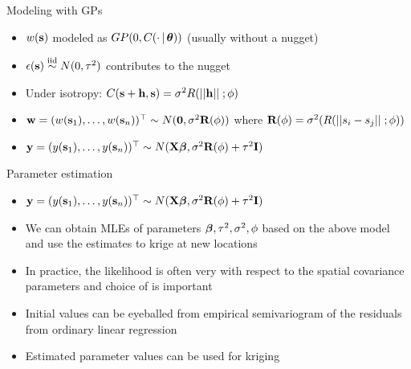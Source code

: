 \begin{frame}{Modeling with GPs}
	\begin{itemize}\setlength{\itemsep}{0.25cm}
		\item $w(\textbf{s})$ modeled as $GP(0,C(\cdot\,|\, \mbox{\boldmath $ \theta $}))$ (usually without a nugget)
		\item $\epsilon(\textbf{s}) \stackrel{\mathrm{iid}}{\sim} N(0,\tau^2)$ contributes to the nugget
		\item Under isotropy: $C(\textbf{s}+\textbf{h},\textbf{s}) = \sigma^2 R(||\textbf{h}|| \; ; \phi )$
		\item $\textbf{w} = (w(\textbf{s}_1),\ldots,w(\textbf{s}_n))^\top \sim N(\textbf{0}, \sigma^2 \textbf{R}(\phi))$ where $\textbf{R}(\phi) = \sigma^2 (R(||s_i-s_j|| \; ; \phi))$
		\item $\textbf{y}=(y(\textbf{s}_1),\ldots,y(\textbf{s}_n))^\top \sim N(\textbf{X}\mbox{\boldmath $ \beta $},\sigma^2 \textbf{R}(\phi) + \tau^2 \textbf{I})$
	\end{itemize}
\end{frame}

\begin{frame}{Parameter estimation}
\begin{itemize}\setlength{\itemsep}{0.25cm}
	\item $\textbf{y}=(y(\textbf{s}_1),\ldots,y(\textbf{s}_n))^\top \sim N(\textbf{X}\mbox{\boldmath $ \beta $},\sigma^2 \textbf{R}(\phi) + \tau^2 \textbf{I})$
	\item We can obtain MLEs of parameters $\mbox{\boldmath $ \beta $}, \tau^2, \sigma^2, \phi$ based on the above model and use the estimates to krige at new locations
	\item In practice, the likelihood is often very  with respect to the spatial covariance parameters and choice of  is important
	\item Initial values can be eyeballed from empirical semivariogram of the residuals from ordinary linear regression
	\item Estimated parameter values can be used for kriging
\end{itemize}
\end{frame}

